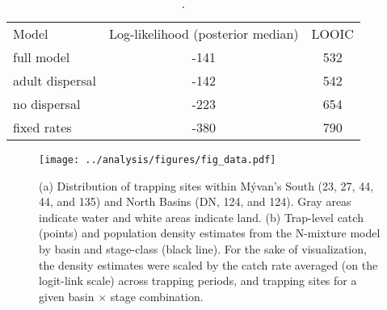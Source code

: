\documentclass[11pt]{article}
\begin{document}


\clearpage



\clearpage
\begin{table}
\caption{\label{tab:compare}
.
}
\setlength{\tabcolsep}{12pt}
\begin{tabular}{lcc}
\toprule
Model                  &    Log-likelihood (posterior median) & LOOIC \\
\cmidrule{1-3}
full model             & -141 & 532 \\
adult dispersal        & -142 & 542 \\
no dispersal           & -223 & 654 \\
fixed rates            & -380 & 790 \\
\bottomrule
\end{tabular}
\end{table}
\clearpage

\clearpage
\begin{figure}
\centering
\texttt{[image: ../analysis/figures/fig\_data.pdf]}
\caption{\label{fig:data}
(a) Distribution of trapping sites within M\'{y}van's
South (23, 27, 44, 44, and 135) and North Basins (DN, 124, and 124). 
Gray areas indicate water and white areas indicate land.
(b) Trap-level catch (points) and 
population density estimates from the N-mixture model by basin and stage-class (black line).
For the sake of visualization, the density estimates were scaled 
by the catch rate averaged (on the logit-link scale) across trapping periods,
and trapping sites for a given basin $\times$ stage combination.
}
\end{figure}
\clearpage
\end{document}
